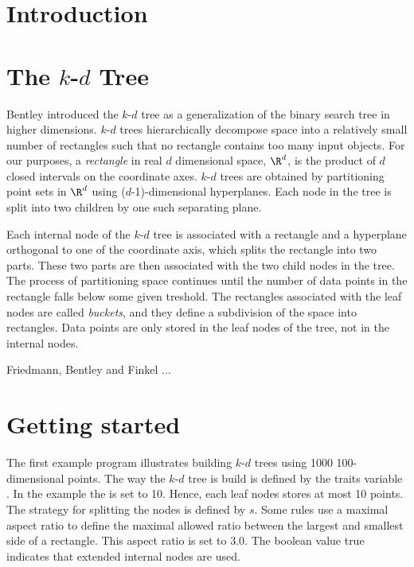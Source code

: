 \section{Introduction}

\section{The $k$-$d$ Tree}

Bentley \cite{b-mbstu-75} introduced the $k$-$d$ tree as a generalization of the binary
search tree in higher dimensions. $k$-$d$ trees hierarchically decompose space into a 
relatively small number of rectangles such that no rectangle contains too many input objects. 
For our purposes, a {\it rectangle} in real $d$ dimensional space, $\R^d$, is the product of $d$ closed 
intervals on the coordinate axes.
$k$-$d$ trees are obtained by partitioning point sets in $\R^d$ using ($d$-1)-dimensional hyperplanes. 
Each node in the tree is split into two children by one such separating plane.

Each internal node of the $k$-$d$ tree is associated with a rectangle and a hyperplane orthogonal to
one of the coordinate axis, which splits the rectangle into two parts. These two parts are then associated
with the two child nodes in the tree. The process of partitioning space continues until the number of data 
points in the rectangle falls below some given treshold. The rectangles associated with the leaf nodes
are called {\it buckets}, and they define a subdivision of the space into rectangles.
Data points are only stored in the leaf nodes of the tree, not in the internal nodes.

Friedmann, Bentley and Finkel \cite{fbf-afbml-77} ...


\section{Getting started}

The first example program illustrates building $k$-$d$ trees using 1000
100-dimensional points. 
The way the $k$-$d$ tree is build is defined by the traits variable .
In the example the  is set to 10.
Hence, each leaf nodes stores at most 10 points. 
The strategy for splitting the nodes is defined by $s$.
Some rules use a maximal aspect ratio to define
the maximal allowed ratio between the largest and smallest side of a rectangle.
This aspect ratio is set to 3.0. The boolean value true indicates that
extended internal nodes are used.


